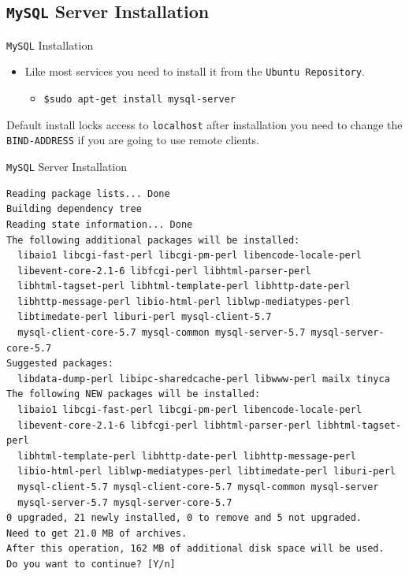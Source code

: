 \documentclass[xcolor=table]{beamer}
\begin{document}
\subsection{\texttt{MySQL} Server Installation}
\begin{frame}{\texttt{MySQL} Installation}
  \begin{itemize}
    \item Like most services you need to install it from the \texttt{Ubuntu Repository}.
      \begin{itemize}
        \item \texttt{\$sudo apt-get install mysql-server}
      \end{itemize}
  \end{itemize}
  \begin{tcolorbox}
    \begin{center}
      \scriptsize Default install locks access to \texttt{localhost} after installation you need to change the \texttt{BIND-ADDRESS} if you are going to use remote clients.
    \end{center}
  \end{tcolorbox}
\end{frame}

\begin{frame}[fragile]{\texttt{MySQL} Server Installation}
  \begin{tcolorbox}
    \lstset{
      basicstyle=\tiny\ttfamily,
    }
    \begin{lstlisting}
Reading package lists... Done
Building dependency tree
Reading state information... Done
The following additional packages will be installed:
  libaio1 libcgi-fast-perl libcgi-pm-perl libencode-locale-perl
  libevent-core-2.1-6 libfcgi-perl libhtml-parser-perl 
  libhtml-tagset-perl libhtml-template-perl libhttp-date-perl 
  libhttp-message-perl libio-html-perl liblwp-mediatypes-perl 
  libtimedate-perl liburi-perl mysql-client-5.7
  mysql-client-core-5.7 mysql-common mysql-server-5.7 mysql-server-core-5.7
Suggested packages:
  libdata-dump-perl libipc-sharedcache-perl libwww-perl mailx tinyca
The following NEW packages will be installed:
  libaio1 libcgi-fast-perl libcgi-pm-perl libencode-locale-perl
  libevent-core-2.1-6 libfcgi-perl libhtml-parser-perl libhtml-tagset-perl
  libhtml-template-perl libhttp-date-perl libhttp-message-perl 
  libio-html-perl liblwp-mediatypes-perl libtimedate-perl liburi-perl 
  mysql-client-5.7 mysql-client-core-5.7 mysql-common mysql-server 
  mysql-server-5.7 mysql-server-core-5.7
0 upgraded, 21 newly installed, 0 to remove and 5 not upgraded.
Need to get 21.0 MB of archives.
After this operation, 162 MB of additional disk space will be used.
Do you want to continue? [Y/n]
    \end{lstlisting}
  \end{tcolorbox}
\end{frame}
\end{document}

